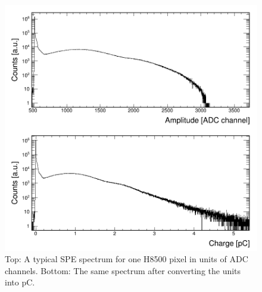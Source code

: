 \begin{figure}[hbt!]
	\centering
	\includegraphics[width=\linewidth]{figures/CA7811_w1_g064_v1100_063_adc_charge.png}
	\caption{Top: A typical SPE spectrum for one H8500 pixel in units of ADC channels. Bottom: The same spectrum after converting the units into pC.}
	\label{fig:H8500calib}
\end{figure}

